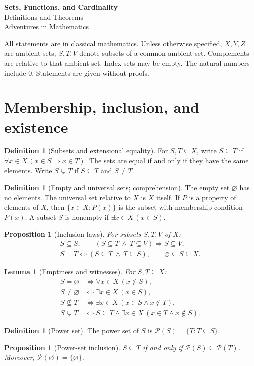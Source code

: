 \documentclass[11pt]{article}
\newtheorem{lemma}[theorem]{Lemma}
\newtheorem{proposition}[theorem]{Proposition}
\theoremstyle{definition}
\newtheorem{definition}[theorem]{Definition}
\newcommand{\Pow}{\mathcal P}
\begin{document}
\begin{center}
{\Large\bfseries Sets, Functions, and Cardinality}\\[5pt]
{\large Definitions and Theorems}\\[4pt]
Adventures in Mathematics
\end{center}
All statements are in classical mathematics. Unless otherwise specified,
$X,Y,Z$ are ambient sets; $S,T,V$ denote subsets of a common ambient set.
Complements are relative to that ambient set. Index sets may be empty.
The natural numbers include $0$. Statements are given without proofs.

\section{Membership, inclusion, and existence}
\begin{definition}[Subsets and extensional equality]
For $S,T\subseteq X$, write $S\subseteq T$ if
$\forall x\in X\,(x\in S\Rightarrow x\in T)$.
The sets are equal if and only if they have the same elements.
Write $S\subsetneq T$ if $S\subseteq T$ and $S\ne T$.
\end{definition}
\begin{definition}[Empty and universal sets; comprehension]
The empty set $\varnothing$ has no elements. The universal set relative
to $X$ is $X$ itself. If $P$ is a property of elements of $X$, then
$\{x\in X:P(x)\}$ is the subset with membership condition $P(x)$.
A subset $S$ is nonempty if $\exists x\in X\,(x\in S)$.
\end{definition}
\begin{proposition}[Inclusion laws]
For subsets $S,T,V$ of $X$:
\begin{gather*}
S\subseteq S,\qquad
(S\subseteq T\ \land\ T\subseteq V)\Rightarrow S\subseteq V,\\
S=T\iff(S\subseteq T\ \land\ T\subseteq S),\qquad
\varnothing\subseteq S\subseteq X.
\end{gather*}
\end{proposition}
\begin{lemma}[Emptiness and witnesses]
For $S,T\subseteq X$:
\begin{align*}
S=\varnothing&\iff\forall x\in X\,(x\notin S),\\
S\ne\varnothing&\iff\exists x\in X\,(x\in S),\\
S\nsubseteq T&\iff\exists x\in X\,(x\in S\land x\notin T),\\
S\subsetneq T&\iff S\subseteq T\land\exists x\in X\,(x\in T\land x\notin S).
\end{align*}
\end{lemma}
\begin{definition}[Power set]
The power set of $S$ is $\Pow(S)=\{T:T\subseteq S\}$.
\end{definition}
\begin{proposition}[Power-set inclusion]
$S\subseteq T$ if and only if $\Pow(S)\subseteq\Pow(T)$.
Moreover, $\Pow(\varnothing)=\{\varnothing\}$.
\end{proposition}
\end{document}
